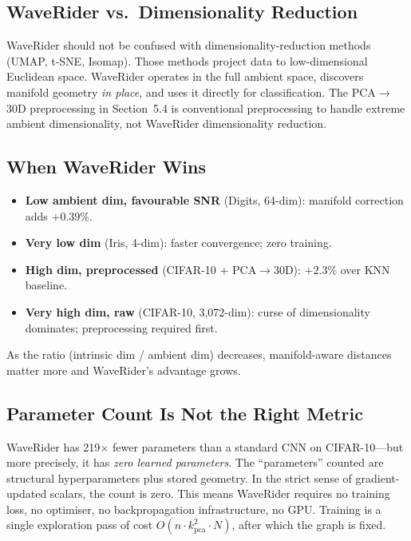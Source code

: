 \documentclass[12pt,letterpaper]{article}
\begin{document}
\subsection{WaveRider vs.\ Dimensionality Reduction}

WaveRider should not be confused with dimensionality-reduction methods (UMAP,
t-SNE, Isomap).  Those methods project data to low-dimensional Euclidean space.
WaveRider operates in the full ambient space, discovers manifold geometry
\emph{in place}, and uses it directly for classification.  The PCA$\to$30D
preprocessing in Section~5.4 is conventional preprocessing to handle extreme
ambient dimensionality, not WaveRider dimensionality reduction.

\subsection{When WaveRider Wins}

\begin{itemize}[leftmargin=*]
  \item \textbf{Low ambient dim, favourable SNR} (Digits, 64-dim): manifold
    correction adds $+0.39\%$.
  \item \textbf{Very low dim} (Iris, 4-dim): faster convergence; zero training.
  \item \textbf{High dim, preprocessed} (CIFAR-10 + PCA$\to$30D): $+2.3\%$
    over KNN baseline.
  \item \textbf{Very high dim, raw} (CIFAR-10, 3{,}072-dim): curse of
    dimensionality dominates; preprocessing required first.
\end{itemize}
As the ratio (intrinsic dim / ambient dim) decreases, manifold-aware distances
matter more and WaveRider's advantage grows.

\subsection{Parameter Count Is Not the Right Metric}

WaveRider has 219$\times$ fewer parameters than a standard CNN on CIFAR-10---but
more precisely, it has \emph{zero learned parameters}.  The ``parameters''
counted are structural hyperparameters plus stored geometry.  In the strict sense
of gradient-updated scalars, the count is zero.  This means WaveRider requires
no training loss, no optimiser, no backpropagation infrastructure, no GPU\@.
Training is a single exploration pass of cost $O(n \cdot k_\text{pca}^2 \cdot N)$,
after which the graph is fixed.
\end{document}

